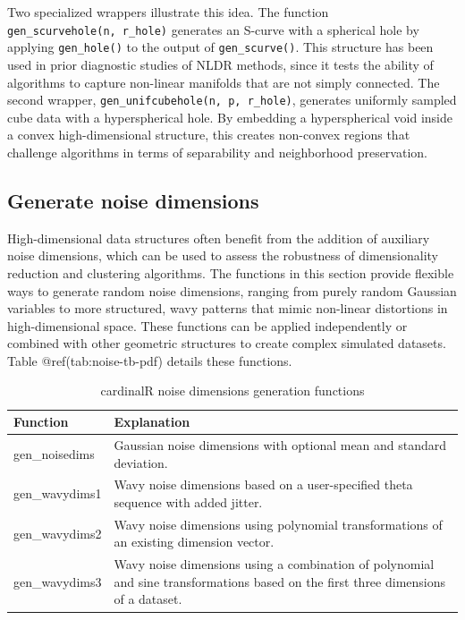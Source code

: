 \documentclass[
  11pt,
  a4paper,
]{report}
\begin{document}
Two specialized wrappers illustrate this idea. The function
\texttt{gen\_scurvehole(n,\ r\_hole)} generates an S-curve with a
spherical hole by applying \texttt{gen\_hole()} to the output of
\texttt{gen\_scurve()}. This structure has been used in prior diagnostic
studies of NLDR methods, since it tests the ability of algorithms to
capture non-linear manifolds that are not simply connected. The second
wrapper, \texttt{gen\_unifcubehole(n,\ p,\ r\_hole)}, generates
uniformly sampled cube data with a hyperspherical hole. By embedding a
hyperspherical void inside a convex high-dimensional structure, this
creates non-convex regions that challenge algorithms in terms of
separability and neighborhood preservation.

\subsection{Generate noise dimensions}\label{generate-noise-dimensions}

High-dimensional data structures often benefit from the addition of
auxiliary noise dimensions, which can be used to assess the robustness
of dimensionality reduction and clustering algorithms. The functions in
this section provide flexible ways to generate random noise dimensions,
ranging from purely random Gaussian variables to more structured, wavy
patterns that mimic non-linear distortions in high-dimensional space.
These functions can be applied independently or combined with other
geometric structures to create complex simulated datasets. Table
@ref(tab:noise-tb-pdf) details these functions.

\begin{table}

\caption{\label{tab:noise-tb-pdf}cardinalR noise dimensions generation functions}
\centering
\begin{tabular}[t]{>{\raggedright\arraybackslash}p{2.5cm}>{\raggedright\arraybackslash}p{10.5cm}}
\toprule
Function & Explanation\\
\midrule
gen\_noisedims & Gaussian noise dimensions with optional mean and standard deviation.\\
gen\_wavydims1 & Wavy noise dimensions based on a user-specified theta sequence with added jitter.\\
gen\_wavydims2 & Wavy noise dimensions using polynomial transformations of an existing dimension vector.\\
gen\_wavydims3 & Wavy noise dimensions using a combination of polynomial and sine transformations based on the first three dimensions of a dataset.\\
\bottomrule
\end{tabular}
\end{table}
\end{document}
